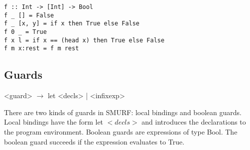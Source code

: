 \begin{verbatim}
f :: Int -> [Int] -> Bool
f _ [] = False
f _ [x, y] = if x then True else False
f 0 _ = True
f x l = if x == (head x) then True else False
f m x:rest = f m rest 
\end{verbatim}

\subsection{Guards}
\begin{grammar}
<guard> $\rightarrow$  let <decls> | <infixexp>          
\end{grammar}

There are two kinds of guards in SMURF: local bindings and boolean guards. Local bindings have the form let $<decls>$ and introduces the declarations to the program environment. Boolean guards are expressions of type Bool. The boolean guard succeeds if the expression evaluates to True.

